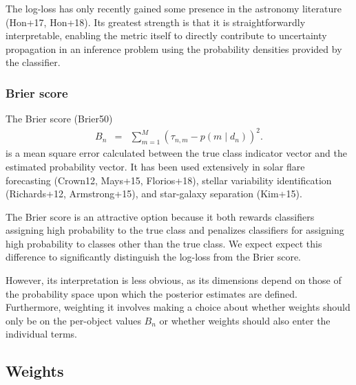 The log-loss has only recently gained some presence in the astronomy literature (Hon+17, Hon+18).
Its greatest strength is that it is straightforwardly interpretable, enabling the metric itself to directly contribute to uncertainty propagation in an inference problem using the probability densities provided by the classifier.

\subsubsection{Brier score}
\label{sec:brier}

The Brier score (Brier50)
\begin{eqnarray}
  \label{eq:brier}
B_{n} &=& \sum_{m=1}^{M}(\tau_{n, m}-p(m \mid d_{n}))^{2}.
\end{eqnarray}
is a mean square error calculated between the true class indicator vector and the estimated probability vector.
It has been used extensively in solar flare forecasting (Crown12, Mays+15, Florios+18), stellar variability identification (Richards+12, Armstrong+15), and star-galaxy separation (Kim+15).

The Brier score is an attractive option because it both rewards classifiers assigning high probability to the true class and penalizes classifiers for assigning high probability to classes other than the true class.
We expect expect this difference to significantly distinguish the log-loss from the Brier score.

However, its interpretation is less obvious, as its dimensions depend on those of the probability space upon which the posterior estimates are defined.
Furthermore, weighting it involves making a choice about whether weights should only be on the per-object values $B_{n}$ or whether weights should also enter the individual terms.

%

\subsection{Weights}
\label{sec:weights}

